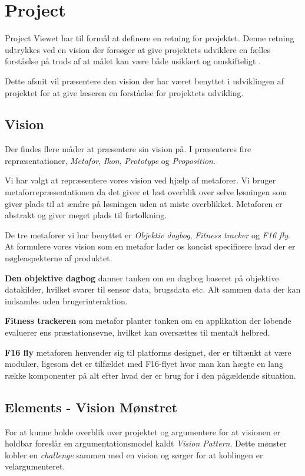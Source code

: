 \section{Project}
Project Viewet har til formål at definere en retning for projektet.
Denne retning udtrykkes ved en vision der forsøger at give projektets udviklere en fælles forståelse på trods af at målet kan være både usikkert og omskifteligt \citet[Kapitel 15 - Project]{art:essence}.

Dette afsnit vil præsentere den vision der har været benyttet i udviklingen af projektet for at give læseren en forståelse for projektets udvikling.

\subsection{Vision}
Der findes flere måder at præsentere sin vision på. 
I \citet[Kapitel 24 - Representation]{art:essence} præsenteres fire repræsentationer, \textit{Metafor}, \textit{Ikon}, \textit{Prototype} og \textit{Proposition}.

Vi har valgt at repræsentere vores vision ved hjælp af metaforer.
Vi bruger metaforrepræsentationen da det giver et løst overblik over selve løsningen som giver plads til at ændre på løsningen uden at miste overblikket. 
Metaforen er abstrakt og giver meget plads til fortolkning.

De tre metaforer vi har benyttet er \textit{Objektiv dagbog}, \textit{Fitness tracker} og \textit{F16 fly}.
At formulere vores vision som en metafor lader os koncist specificere hvad der er nøgleaspekterne af produktet.

\textbf{Den objektive dagbog} danner tanken om en dagbog baseret på objektive datakilder, hvilket svarer til sensor data, brugsdata etc.
Alt sammen data der kan indsamles uden brugerinteraktion.

\textbf{Fitness trackeren} som metafor planter tanken om en applikation der løbende evaluerer ens præstationsevne, hvilket kan oversættes til mentalt helbred.

\textbf{F16 fly} metaforen henvender sig til platforms designet, der er tiltænkt at være modulær, ligesom det er tilfældet med F16-flyet hvor man kan hægte en lang række komponenter på alt efter hvad der er brug for i den pågældende situation.

\subsection{Elements - Vision Mønstret}
For at kunne holde overblik over projektet og argumentere for at visionen er holdbar foreslår \citet[Kapitel 15 - Project]{art:essence} en argumentationsmodel kaldt \emph{Vision Pattern}. 
Dette mønster kobler en \emph{challenge}  sammen med en vision og sørger for at koblingen er velargumenteret.

